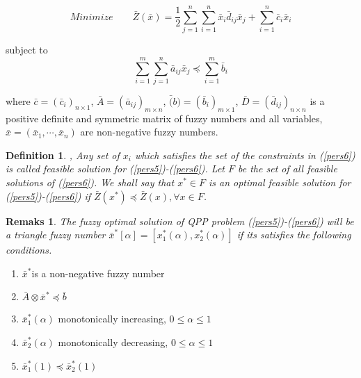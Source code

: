 \documentclass{iaesarticle3}
\newtheorem{definition}{Definition}
\newtheorem{rem}{Remaks}
\begin{document}
\begin{equation}\label{pers5}                                             %
    Minimize \qquad \bar{Z}(\bar{x}) = \frac{1}{2} \sum_{j=1}^n \sum_{i=1}^n \bar{x}_i \bar{d}_{ij} \bar{x}_j + \sum_{i=1}^n \bar{c}_i\bar{x}_i
\end{equation}

\noindent subject to
\begin{equation}\label{pers6}                                              %
    \sum_{i=1}^m \sum_{j=1}^n \bar{a}_{ij} \bar{x}_j \preceq \sum_{i=1}^m \bar{b}_i
\end{equation}

\noindent where $\bar{c} = (\bar{c}_i)_{n \times 1}$, $\bar{A} = (\bar{a}_{ij})_{m \times n}$, $\bar(b) = (\bar{b}_i)_{m \times 1}$, $\bar{D} = (\bar{d}_{ij})_{n \times n}$ is a positive definite and symmetric matrix of fuzzy numbers and all variables, $\bar{x} = (\bar{x}_1, \cdots, \bar{x}_n)$ are non-negative fuzzy numbers.


\begin{definition}
      \emph{\cite{mal}}, Any set of $x_i$ which satisfies the set of the constraints in (\ref{pers6}) is called feasible solution for (\ref{pers5})-(\ref{pers6}). Let $F$ be the set  of all feasible solutions of (\ref{pers6}). We shall say that $x^* \in F$ is an optimal feasible solution for (\ref{pers5})-(\ref{pers6}) if $\bar{Z}(x^*) \preceq \bar{Z}(x),  \forall x \in F$.
\end{definition}

\begin{rem}
    The fuzzy optimal solution of QPP problem (\ref{pers5})-(\ref{pers6}) will be a triangle fuzzy number $\bar{x}^*[\alpha] = [x_1^*(\alpha), x_2^*(\alpha)]$ if its satisfies the following conditions.
\end{rem}

\begin{enumerate}
  \item $\bar{x}^* $is a non-negative fuzzy number
  \item $\bar{A}\otimes \bar{x}^* \preceq \bar{b}$
  \item $\bar{x}_1^*(\alpha)$ monotonically increasing, $0 \leq \alpha \leq 1$
  \item $\bar{x}_2^*(\alpha)$ monotonically decreasing, $0 \leq \alpha \leq 1$
  \item $\bar{x}_1^*(1) \preceq \bar{x}_2^*(1)$
\end{enumerate}
\end{document}
